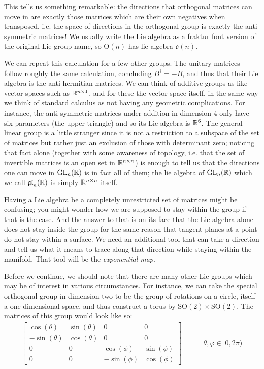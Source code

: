 \documentclass[11pt]{article}
\begin{document}
This tells us something remarkable: the directions that orthogonal matrices can move in are exactly those matrices which are their own negatives when transposed, i.e. the space of directions in the orthogonal group is exactly the anti-symmetric matrices! We usually write the Lie algebra as a fraktur font version of the original Lie group name, so $\mathrm{O}(n)$ has lie algebra $\mathfrak{o}(n)$.

We can repeat this calculation for a few other groups. The unitary matrices follow roughly the same calculation, concluding $B^\dagger = -B$, and thus that their Lie algebra is the anti-hermitian matrices.  We can think of additive groups as like vector spaces such as $\mathbb{R}^{n \times 1}$, and for these the vector space itself, in the same way we think of standard calculus as not having any geometric complications. For instance, the anti-symmetric matrices under addition in dimension 4 only have six parameters (the upper triangle) and so its Lie algebra is $\mathbb{R}^6$. The general linear group is a little stranger since it is not a restriction to a subspace of the set of matrices but rather just an exclusion of those with determinant zero; noticing that fact alone (together with some awareness of topology, i.e. that the set of invertible matrices is an open set in $\mathbb{R}^{n \times n}$) is enough to tell us that the directions one can move in $\mathrm{GL}_n(\mathbb{R})$ is in fact all of them; the lie algebra of $\mathrm{GL}_n(\mathbb{R})$ which we call $\mathfrak{gl}_n(\mathbb{R})$ is simply $\mathbb{R}^{n \times n}$ itself.

Having a Lie algebra be a completely unrestricted set of matrices might be confusing; you might wonder how we are supposed to stay within the group if that is the case. And the answer to that is on its face that the Lie algebra alone does not stay inside the group for the same reason that tangent planes at a point do not stay within a surface. We need an additional tool that can take a direction and tell us what it means to trace along that direction while staying within the manifold. That tool will be the \emph{exponential map}.

Before we continue, we should note that there are many other Lie groups which may be of interest in various circumstances. For instance, we can take the special orthogonal group in dimension two to be the group of rotations on a circle, itself a one dimensional space, and thus construct a torus by $\mathrm{SO}(2) \times \mathrm{SO}(2)$. The matrices of this group would look like so: \begin{gather*}
\begin{bmatrix}
\cos(\theta) & \sin(\theta) & 0 & 0 \\
-\sin(\theta) & \cos(\theta) & 0 & 0 \\ 
0 & 0 & \cos(\phi) & \sin(\phi)  \\
0 & 0 & -\sin(\phi) & \cos(\phi)
\end{bmatrix} \hspace{3em} \theta,\varphi \in [0,2\pi)
\end{gather*}
\end{document}
